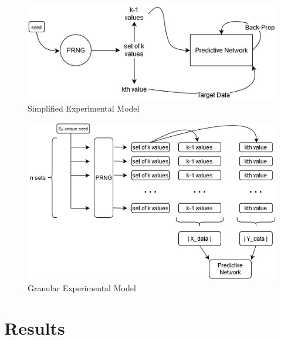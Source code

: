 \documentclass[conference]{IEEEtran}
\begin{document}
\begin{figure}[H]
\centering
\includegraphics[width=1\linewidth]{./Images/SimpleModel.png}
\caption{Simplified Experimental Model}
\label{fig:Simplified Experimental Model}
\end{figure}

\begin{figure}[H]
\centering
\includegraphics[width=1\linewidth]{./Images/GranularModel.png}
\caption{Granular Experimental Model}
\label{fig:Granular Experimental Model}
\end{figure}


\section{Results}
\end{document}
